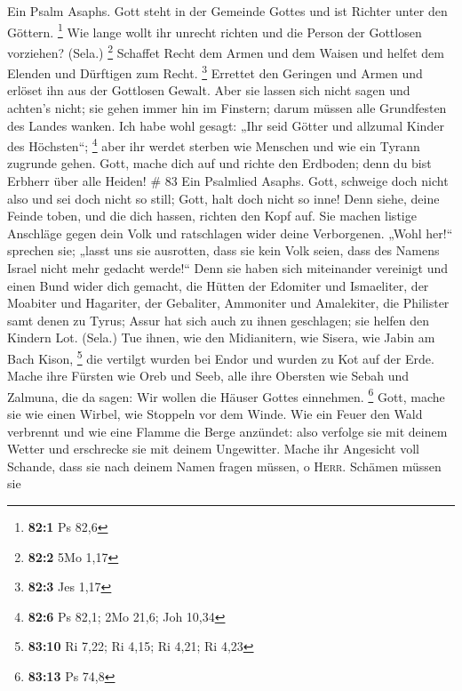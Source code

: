  Ein Psalm Asaphs. Gott steht in der Gemeinde Gottes und
ist Richter unter den Göttern. \footnote{\textbf{82:1} Ps 82,6}
 Wie lange wollt ihr unrecht richten und die Person der
Gottlosen vorziehen? (Sela.) \footnote{\textbf{82:2} 5Mo 1,17}
 Schaffet Recht dem Armen und dem Waisen und helfet dem
Elenden und Dürftigen zum Recht. \footnote{\textbf{82:3} Jes 1,17}
 Errettet den Geringen und Armen und erlöset ihn aus der
Gottlosen Gewalt.  Aber sie lassen sich nicht sagen und
achten's nicht; sie gehen immer hin im Finstern; darum müssen alle
Grundfesten des Landes wanken.  Ich habe wohl gesagt: „Ihr
seid Götter und allzumal Kinder des Höchsten``; \footnote{\textbf{82:6}
  Ps 82,1; 2Mo 21,6; Joh 10,34}  aber ihr werdet sterben
wie Menschen und wie ein Tyrann zugrunde gehen.  Gott,
mache dich auf und richte den Erdboden; denn du bist Erbherr über alle
Heiden! \# 83  Ein Psalmlied Asaphs.  Gott,
schweige doch nicht also und sei doch nicht so still; Gott, halt doch
nicht so inne!  Denn siehe, deine Feinde toben, und die
dich hassen, richten den Kopf auf.  Sie machen listige
Anschläge gegen dein Volk und ratschlagen wider deine Verborgenen.
 „Wohl her!{}`` sprechen sie; „lasst uns sie ausrotten,
dass sie kein Volk seien, dass des Namens Israel nicht mehr gedacht
werde!{}``  Denn sie haben sich miteinander vereinigt und
einen Bund wider dich gemacht,  die Hütten der Edomiter
und Ismaeliter, der Moabiter und Hagariter,  der
Gebaliter, Ammoniter und Amalekiter, die Philister samt denen zu Tyrus;
 Assur hat sich auch zu ihnen geschlagen; sie helfen den
Kindern Lot. (Sela.)  Tue ihnen, wie den Midianitern, wie
Sisera, wie Jabin am Bach Kison, \footnote{\textbf{83:10} Ri 7,22; Ri
  4,15; Ri 4,21; Ri 4,23}  die vertilgt wurden bei Endor
und wurden zu Kot auf der Erde.  Mache ihre Fürsten wie
Oreb und Seeb, alle ihre Obersten wie Sebah und Zalmuna, 
die da sagen: Wir wollen die Häuser Gottes einnehmen. \footnote{\textbf{83:13}
  Ps 74,8}  Gott, mache sie wie einen Wirbel, wie
Stoppeln vor dem Winde.  Wie ein Feuer den Wald verbrennt
und wie eine Flamme die Berge anzündet:  also verfolge
sie mit deinem Wetter und erschrecke sie mit deinem Ungewitter.
 Mache ihr Angesicht voll Schande, dass sie nach deinem
Namen fragen müssen, o \textsc{Herr}.  Schämen müssen sie
